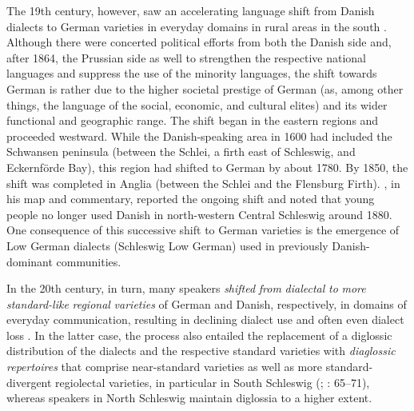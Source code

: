\documentclass[output=paper]{langsci/langscibook}
\begin{document}
The 19th century, however, saw an accelerating language shift from Danish dialects to German varieties in everyday domains in rural areas in the south \citep[59]{Hoder.2019}. Although there were concerted political efforts from both the Danish side and, after 1864, the Prussian side as well to strengthen the respective national languages and suppress the use of the minority languages, the shift towards German is rather due to the higher societal prestige of German (as, among other things, the language of the social, economic, and cultural elites) and its wider functional and geographic range. The shift began in the eastern regions and proceeded westward. While the Danish-speaking area in 1600 had included the Schwansen peninsula (between the Schlei, a firth east of Schleswig, and Eckernförde Bay), this region had shifted to German by about 1780. By 1850, the shift was completed in Anglia (between the Schlei and the Flensburg Firth). \citep[3--6]{Wenker.2013}, in his map and commentary, reported the ongoing shift and noted that young people no longer used Danish in north-western Central Schleswig around 1880. One consequence of this successive shift to German varieties is the emergence of Low German dialects (Schleswig Low German) used in previously Danish-dominant communities.

In the 20th century, in turn, many speakers \textit{shifted} \textit{from} \textit{dialectal} \textit{to} \textit{more} \textit{standard-like} \textit{regional} \textit{varieties} of German and Danish, respectively, in domains of everyday communication, resulting in declining dialect use and often even dialect loss \citep[62]{Hoder.2019}. In the latter case, the process also entailed the replacement of a diglossic distribution of the dialects and the respective standard varieties with \textit{diaglossic} \textit{repertoires} \citep{Auer.2011} that comprise near-standard varieties as well as more standard-divergent regiolectal varieties, in particular in South Schleswig (\citealt{Hoder.2011}; \citeyear{Hoder.2019}: 65--71), whereas speakers in North Schleswig maintain diglossia to a higher extent.
\end{document}
